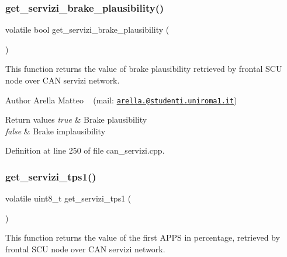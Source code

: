 \subsubsection{\texorpdfstring{get\+\_\+servizi\+\_\+brake\+\_\+plausibility()}{get\_servizi\_brake\_plausibility()}}
{\footnotesize\ttfamily volatile bool get\+\_\+servizi\+\_\+brake\+\_\+plausibility (\begin{DoxyParamCaption}{ }\end{DoxyParamCaption})}



This function returns the value of brake plausibility retrieved by frontal S\+CU node over C\+AN servizi network. 

\begin{DoxyAuthor}{Author}
Arella Matteo ~\newline
 (mail\+: \href{mailto:arella.1646983@studenti.uniroma1.it}{\tt arella.@studenti.\+uniroma1.\+it})
\end{DoxyAuthor}

\begin{DoxyRetVals}{Return values}
{\em true} & Brake plausibility \\
\hline
{\em false} & Brake implausibility \\
\hline
\end{DoxyRetVals}


Definition at line 250 of file can\+\_\+servizi.\+cpp.

\mbox{\label{group___c_a_n__servizi__group_gac899876f81f391e2daafcd8b22d2f32e}} 
\subsubsection{\texorpdfstring{get\+\_\+servizi\+\_\+tps1()}{get\_servizi\_tps1()}}
{\footnotesize\ttfamily volatile uint8\+\_\+t get\+\_\+servizi\+\_\+tps1 (\begin{DoxyParamCaption}{ }\end{DoxyParamCaption})}



This function returns the value of the first A\+P\+PS in percentage, retrieved by frontal S\+CU node over C\+AN servizi network. 

